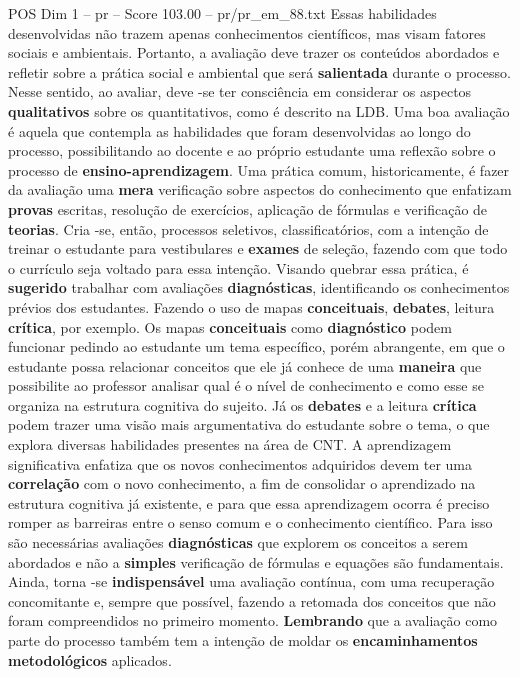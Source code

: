 \begin{textsample}{POS Dim 1 – pr – Score 103.00 – pr/pr\_em\_88.txt}
Essas habilidades desenvolvidas não trazem apenas conhecimentos científicos, mas visam fatores sociais e ambientais.
Portanto, a avaliação deve trazer os conteúdos abordados e refletir sobre a prática social e ambiental que será \textbf{salientada} durante o processo.
Nesse sentido, ao avaliar, deve -se ter consciência em considerar os aspectos \textbf{qualitativos} sobre os quantitativos, como é descrito na LDB.
Uma boa avaliação é aquela que contempla as habilidades que foram desenvolvidas ao longo do processo, possibilitando ao docente e ao próprio estudante uma reflexão sobre o processo de \textbf{ensino-aprendizagem}.
Uma prática comum, historicamente, é fazer da avaliação uma \textbf{mera} verificação sobre aspectos do conhecimento que enfatizam \textbf{provas} escritas, resolução de exercícios, aplicação de fórmulas e verificação de \textbf{teorias}.
Cria -se, então, processos seletivos, classificatórios, com a intenção de treinar o estudante para vestibulares e \textbf{exames} de seleção, fazendo com que todo o currículo seja voltado para essa intenção.
Visando quebrar essa prática, é \textbf{sugerido} trabalhar com avaliações \textbf{diagnósticas}, identificando os conhecimentos prévios dos estudantes.
Fazendo o uso de mapas \textbf{conceituais}, \textbf{debates}, leitura \textbf{crítica}, por exemplo.
Os mapas \textbf{conceituais} como \textbf{diagnóstico} podem funcionar pedindo ao estudante um tema específico, porém abrangente, em que o estudante possa relacionar conceitos que ele já conhece de uma \textbf{maneira} que possibilite ao professor analisar qual é o nível de conhecimento e como esse se organiza na estrutura cognitiva do sujeito.
Já os \textbf{debates} e a leitura \textbf{crítica} podem trazer uma visão mais argumentativa do estudante sobre o tema, o que explora diversas habilidades presentes na área de CNT.
A aprendizagem significativa enfatiza que os novos conhecimentos adquiridos devem ter uma \textbf{correlação} com o novo conhecimento, a fim de consolidar o aprendizado na estrutura cognitiva já existente, e para que essa aprendizagem ocorra é preciso romper as barreiras entre o senso comum e o conhecimento científico.
Para isso são necessárias avaliações \textbf{diagnósticas} que explorem os conceitos a serem abordados e não a \textbf{simples} verificação de fórmulas e equações são fundamentais.
Ainda, torna -se \textbf{indispensável} uma avaliação contínua, com uma recuperação concomitante e, sempre que possível, fazendo a retomada dos conceitos que não foram compreendidos no primeiro momento. \textbf{Lembrando} que a avaliação como parte do processo também tem a intenção de moldar os \textbf{encaminhamentos} \textbf{metodológicos} aplicados.

\end{textsample}
